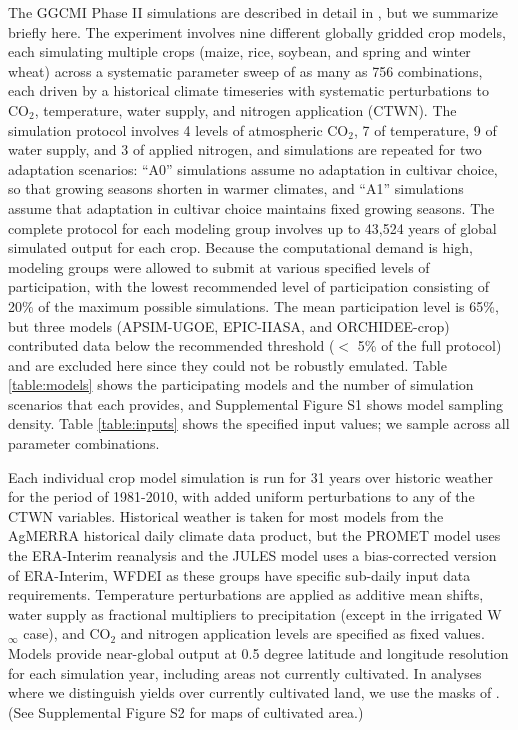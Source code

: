 \documentclass[gmd, manuscript]{copernicus} %
\begin{document}
The GGCMI Phase II simulations are described in detail in \citet{franke2019ctwnexperiment}, but we summarize briefly here. 
The experiment involves nine different globally gridded crop models, each simulating multiple crops (maize, rice, soybean, and spring and winter wheat) across a systematic parameter sweep of as many as 756 combinations, each driven by a historical climate timeseries with systematic perturbations to CO$_2$, temperature, water supply, and nitrogen application (CTWN). 
The simulation protocol involves 4 levels of atmospheric CO$_2$, 7 of temperature, 9 of water supply, and 3 of applied nitrogen, and simulations are repeated for two adaptation scenarios: ``A0'' simulations assume no adaptation in cultivar choice, so that growing seasons shorten in warmer climates, and ``A1'' simulations assume that adaptation in cultivar choice maintains fixed growing seasons.
The complete protocol for each modeling group involves up to 43,524 years of global simulated output for each crop. 
Because the computational demand is high, modeling groups were allowed to submit at various specified levels of participation, with the lowest recommended level of participation consisting of 20\% of the maximum possible simulations. The mean participation level is 65\%, but three models (APSIM-UGOE, EPIC-IIASA, and ORCHIDEE-crop) contributed data below the recommended threshold ($<$ 5\% of the full protocol) and are excluded here since they could not be robustly emulated. 
Table \ref{table:models} shows the participating models and the number of simulation scenarios that each provides, and Supplemental Figure S1 shows model sampling density. Table \ref{table:inputs} shows the specified input values; we sample across all parameter combinations. 

Each individual crop model simulation is run for 31 years over historic weather for the period of 1981-2010, with added uniform perturbations to any of the CTWN variables.
Historical weather is taken for most models from the AgMERRA \citep{Ruane2015} historical daily climate data product, but the PROMET model uses the ERA-Interim reanalysis \citep{dee2011era} and the JULES model uses a bias-corrected version of ERA-Interim, WFDEI \citep[WATCH-Forcing-Data-ERA-Interim,][]{weedon2014wfdei} as these groups have specific sub-daily input data requirements. 
Temperature perturbations are applied as additive mean shifts, water supply as fractional multipliers to precipitation (except in the irrigated W$_{\infty}$ case), and CO$_2$ and nitrogen application levels are specified as fixed values. 
Models provide near-global output at 0.5 degree latitude and longitude resolution for each simulation year, including areas not currently cultivated. 
In analyses where we distinguish yields over currently cultivated land, we use the masks of \citet{Portmann2010}. 
(See Supplemental Figure S2 for maps of cultivated area.)
\end{document}
